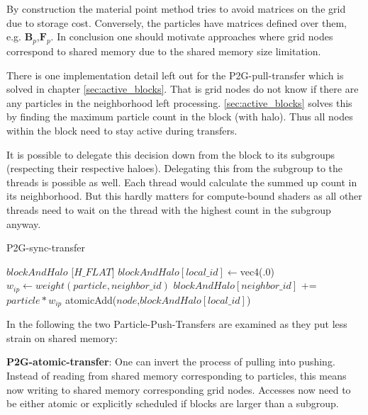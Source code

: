 \documentclass[m,times]{cgMA}
\begin{document}
By construction the material point method tries to avoid matrices on the grid due to storage cost. Conversely, the particles have matrices defined over them, e.g. $\boldsymbol{B}_p$,$\boldsymbol{F}_p$. In conclusion one should motivate approaches where grid nodes correspond to shared memory due to the shared memory size limitation.

There is one implementation detail left out for the P2G-pull-transfer which is solved in chapter \ref{sec:active_blocks}. That is grid nodes do not know if there are any particles in the neighborhood left processing. \ref{sec:active_blocks} solves this by finding the maximum particle count in the block (with halo). Thus all nodes within the block need to stay active during transfers.

It is possible to delegate this decision down from the block to its subgroups (respecting their respective haloes). Delegating this from the subgroup to the threads is possible as well. Each thread would calculate the summed up count in its neighborhood. But this hardly matters for compute-bound shaders as all other threads need to wait on the thread with the highest count in the subgroup anyway.

\begin{algorithm}[t]
  \caption{P2G-sync-transfer}\label{alg:p2g}
  \begin{algorithmic}[1]
    \State {} $blockAndHalo$ [$H\_FLAT$]
      \State $blockAndHalo[local\_id] \gets $vec4(.0)
      \EndFor
      \State {}
        \label{alg:p2g_dyn_loop}
       
	\State $w_{ip} \gets weight(particle,neighbor\_id)$
	\State $blockAndHalo[neighbor\_id] $ += $ particle*w_{ip}$
	\State {}  \label{alg:p2g_uniform_barrier}
	\EndFor
      \EndFor
      \State atomicAdd($node$,$blockAndHalo[local\_id]$) \label{alg:atomicAdd}
      \EndFor
    \ENDFAP
  \end{algorithmic}
\end{algorithm}

In the following the two Particle-Push-Transfers are examined as they put less strain on shared memory:

\textbf{P2G-atomic-transfer}: One can invert the process of pulling into pushing. Instead of reading from shared memory corresponding to particles, this means now writing to shared memory corresponding grid nodes. Accesses now need to be either atomic or explicitly scheduled if blocks are larger than a subgroup.
\end{document}
